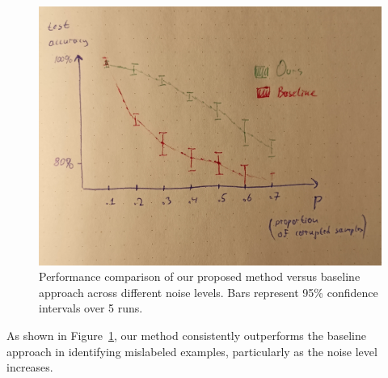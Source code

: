 \documentclass[12pt]{article}
\begin{document}
\begin{figure}[H]
    \centering
    \includegraphics[width=0.9\linewidth]{figures/example_plot.jpg}
    \caption{Performance comparison of our proposed method versus baseline approach across different noise levels. Bars represent 95\% confidence intervals over 5 runs.}
    \label{fig:noise_detection}
\end{figure}

As shown in Figure~\ref{fig:noise_detection}, our method consistently outperforms the baseline approach in identifying mislabeled examples, particularly as the noise level increases.









\end{document}
